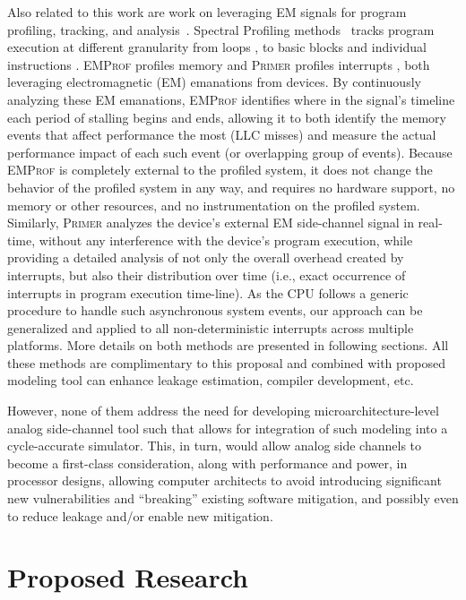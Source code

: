 \documentclass[11 pt]{article}
\begin{document}
Also related to this work are work on leveraging EM signals for program profiling, tracking, and analysis~\cite{7783762,Gorman:2017:AON:3123939.3123973,Elvan2021,Zop, Zop2,Moumita2018,Moumita2022}. Spectral Profiling methods~\cite{7783762,Zop,Zop2,Elvan2021} tracks program execution at different granularity from loops \cite{7783762}, to basic blocks \cite{Zop,Zop2} and individual instructions \cite{Elvan2021}. \textsc{EMProf} profiles memory \cite{Moumita2018} and \textsc{Primer} profiles interrupts \cite{Moumita2022}, both leveraging electromagnetic (EM) emanations from devices. By continuously analyzing these EM emanations, \textsc{EMProf} identifies where in the signal's timeline each period of stalling begins and ends, allowing it to both identify the memory events that affect performance the most (LLC misses) and measure the actual performance impact of each such event (or overlapping group of events). Because \textsc{EMProf} is completely external to the profiled system, it does not change the behavior of the profiled system in any way, and requires no hardware support, no memory or other resources, and no instrumentation on the profiled system. Similarly, \textsc{Primer} analyzes the device's external EM side-channel signal in real-time, without any interference with the device's program execution, while providing a detailed analysis of not only the overall overhead created by interrupts, but also their distribution over time (i.e., exact occurrence of interrupts in program execution time-line). As the CPU follows a generic procedure to handle such asynchronous system events, our approach can be generalized and applied to all non-deterministic interrupts across multiple platforms. More details on both methods are presented in following sections. All these methods are complimentary to this proposal and combined with proposed modeling tool can enhance leakage estimation, compiler development, etc.

However, none of them address the need for developing microarchitecture-level analog side-channel tool such that allows for integration of such modeling into a cycle-accurate simulator. This, in turn, would allow analog side channels to become a first-class consideration, along with performance and power, in processor designs, allowing computer architects to avoid introducing significant new vulnerabilities and ``breaking'' existing software mitigation, and possibly even to reduce leakage and/or enable new mitigation.

\section{Proposed Research}
\label{sec:proposed}
\end{document}
